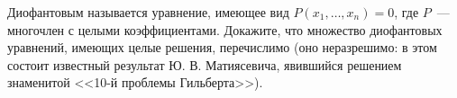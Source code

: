 Диофантовым называется уравнение, имеющее вид $P(x_1, \dots, x_n) = 0$, где $P$~--- многочлен с целыми
коэффициентами. Докажите, что множество диофантовых уравнений, имеющих целые решения, перечислимо (оно
неразрешимо: в этом состоит известный результат Ю. В. Матиясевича, явившийся решением знаменитой <<10-й
проблемы Гильберта>>).
